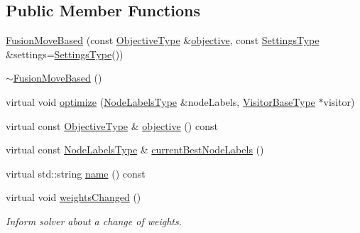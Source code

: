 \subsection*{Public Member Functions}
\begin{DoxyCompactItemize}
\item 
\hyperlink{classnifty_1_1graph_1_1opt_1_1multicut_1_1FusionMoveBased_af6ced8e66854c10174e5d326b0bfa09f}{Fusion\+Move\+Based} (const \hyperlink{classnifty_1_1graph_1_1opt_1_1multicut_1_1FusionMoveBased_ac860a461dd2c12fd2e67553a4457ee58}{Objective\+Type} \&\hyperlink{classnifty_1_1graph_1_1opt_1_1multicut_1_1FusionMoveBased_a4feaafa03aaeab42931ee2a5b40b0307}{objective}, const \hyperlink{structnifty_1_1graph_1_1opt_1_1multicut_1_1FusionMoveBased_1_1SettingsType}{Settings\+Type} \&settings=\hyperlink{structnifty_1_1graph_1_1opt_1_1multicut_1_1FusionMoveBased_1_1SettingsType}{Settings\+Type}())
\item 
\hyperlink{classnifty_1_1graph_1_1opt_1_1multicut_1_1FusionMoveBased_a9a04613260e31583aeffc9343e96a293}{$\sim$\+Fusion\+Move\+Based} ()
\item 
virtual void \hyperlink{classnifty_1_1graph_1_1opt_1_1multicut_1_1FusionMoveBased_a4d49383fec48f42f7cba00268e0a59b9}{optimize} (\hyperlink{classnifty_1_1graph_1_1opt_1_1multicut_1_1FusionMoveBased_aba413de6d17c8728f09126c45e621cdd}{Node\+Labels\+Type} \&node\+Labels, \hyperlink{classnifty_1_1graph_1_1opt_1_1common_1_1SolverBase_ad9932afb08dd17d375de4b15da9ffaa6}{Visitor\+Base\+Type} $\ast$visitor)
\item 
virtual const \hyperlink{classnifty_1_1graph_1_1opt_1_1multicut_1_1FusionMoveBased_ac860a461dd2c12fd2e67553a4457ee58}{Objective\+Type} \& \hyperlink{classnifty_1_1graph_1_1opt_1_1multicut_1_1FusionMoveBased_a4feaafa03aaeab42931ee2a5b40b0307}{objective} () const
\item 
virtual const \hyperlink{classnifty_1_1graph_1_1opt_1_1multicut_1_1FusionMoveBased_aba413de6d17c8728f09126c45e621cdd}{Node\+Labels\+Type} \& \hyperlink{classnifty_1_1graph_1_1opt_1_1multicut_1_1FusionMoveBased_aabc560461fe638b3b21fd80cdaa403ff}{current\+Best\+Node\+Labels} ()
\item 
virtual std\+::string \hyperlink{classnifty_1_1graph_1_1opt_1_1multicut_1_1FusionMoveBased_af6dca89bd863d8c6f577a6cea0a18c98}{name} () const
\item 
virtual void \hyperlink{classnifty_1_1graph_1_1opt_1_1multicut_1_1FusionMoveBased_acf62cb1de04c57534601efaff463af0f}{weights\+Changed} ()
\begin{DoxyCompactList}\small\item\em Inform solver about a change of weights. \end{DoxyCompactList}\end{DoxyCompactItemize}



